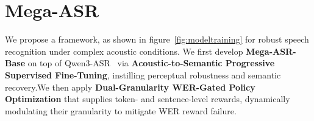 \documentclass{article}
\begin{document}


\vspace{-2mm}
\section{Mega-ASR}
\vspace{-2mm}
We propose a framework, as shown in figure~\ref{fig:modeltraining} for robust speech recognition under complex acoustic conditions. We first develop \textbf{Mega-ASR-Base} on top of Qwen3-ASR~\citep{qwen3-asr} via \textbf{Acoustic-to-Semantic Progressive Supervised Fine-Tuning}, instilling perceptual robustness and semantic recovery.We then apply \textbf{Dual-Granularity WER-Gated Policy Optimization} that supplies token- and sentence-level rewards, dynamically modulating their granularity to mitigate WER reward failure.
\end{document}

